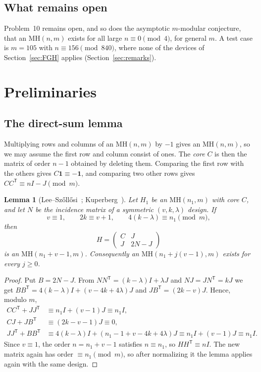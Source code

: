 \documentclass[10pt]{article}
\newtheorem{lemma}{Lemma}
\theoremstyle{remark}
\newcommand{\MH}{\mathrm{MH}}
\begin{document}
\subsection{What remains open}
Problem~10 remains open, and so does the asymptotic $m$-modular conjecture, that an $\MH(n,m)$ exists for all large $n\equiv0\pmod4$, for general $m$. A test case is $m=105$ with $n\equiv156\pmod{840}$, where none of the devices of Section~\ref{sec:FGH} applies (Section~\ref{sec:remarks}).

\section{Preliminaries}\label{sec:prelim}

\subsection{The direct-sum lemma}
Multiplying rows and columns of an $\mathrm{MH}(n,m)$ by $-1$ gives an $\mathrm{MH}(n,m)$, so we may assume the first row and column consist of ones. The \emph{core} $C$ is then the matrix of order $n-1$ obtained by deleting them. Comparing the first row with the others gives $C\mathbf 1\equiv-\mathbf 1$, and comparing two other rows gives $CC^{\mathsf T}\equiv nI-J \pmod m$.

\begin{lemma}[{Lee--Sz\H{o}ll\H{o}si~\cite[Lemma~3.6]{LS}; Kuperberg~\cite[Lemmas~3.5, 4.4]{K}}]\label{lem:splice}
Let $H_1$ be an $\mathrm{MH}(n_1,m)$ with core $C$, and let $N$ be the incidence matrix of a symmetric $(v,k,\lambda)$ design. If
\[
v\equiv1,\qquad 2k\equiv v+1,\qquad 4(k-\lambda)\equiv n_1 \pmod m,
\]
then
\[
H=\begin{pmatrix} C & J\\ J & 2N-J\end{pmatrix}
\]
is an $\mathrm{MH}(n_1+v-1,m)$. Consequently an $\mathrm{MH}(n_1+j(v-1),m)$ exists for every $j\ge0$.
\end{lemma}

\begin{proof}
Put $B=2N-J$. From $NN^{\mathsf T}=(k-\lambda)I+\lambda J$ and $NJ=JN^{\mathsf T}=kJ$ we get $BB^{\mathsf T}=4(k-\lambda)I+(v-4k+4\lambda)J$ and $JB^{\mathsf T}=(2k-v)J$. Hence, modulo $m$,
\begin{align*}
CC^{\mathsf T}+JJ^{\mathsf T}&\equiv n_1I+(v-1)J\equiv n_1I,\\
CJ+JB^{\mathsf T}&\equiv(2k-v-1)J\equiv0,\\
JJ^{\mathsf T}+BB^{\mathsf T}&\equiv 4(k-\lambda)I+(n_1-1+v-4k+4\lambda)J\equiv n_1I+(v-1)J\equiv n_1I.
\end{align*}
Since $v\equiv1$, the order $n=n_1+v-1$ satisfies $n\equiv n_1$, so $HH^{\mathsf T}\equiv nI$. The new matrix again has order $\equiv n_1 \pmod m$, so after normalizing it the lemma applies again with the same design.
\end{proof}
\end{document}
